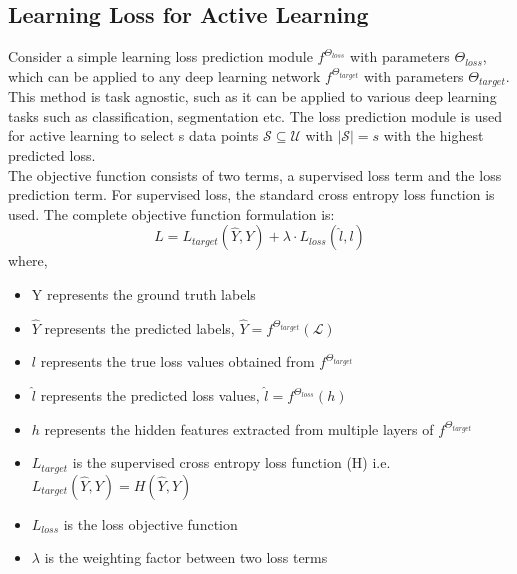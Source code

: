 \subsection{Learning Loss for Active Learning}
Consider a simple learning loss prediction module\cite{yoo2019} $f^{\Theta_{loss}}$ with parameters $\Theta_{loss}$, which can be applied to any deep learning network $f^{\Theta_{target}}$ with parameters $\Theta_{target}$. This method is task agnostic, such as it can be applied to various deep learning tasks such as classification, segmentation etc. The loss prediction module is used for active learning to select s data points $\mathcal{S} \subseteq \mathcal{U}$ with $|\mathcal{S}| = s$ with the highest predicted loss. \\
The objective function consists of two terms, a supervised loss term and the loss prediction term. For supervised loss, the standard cross entropy loss function\cite{cox1958} is used. The complete objective function formulation is:
\begin{equation}
    \label{equation:learning_loss_full_loss}
    L = L_{target}(\hat{Y}, Y) + \lambda \cdot L_{loss}(\hat{l}, l)
\end{equation}
where,
\begin{itemize}[label={}]
  \setlength\itemsep{0em}
  \item Y represents the ground truth labels
  \item $\hat{Y}$ represents the predicted labels, $\hat{Y} = f^{\Theta_{target}}(\mathcal{L})$
  \item $l$ represents the true loss values obtained from $f^{\Theta_{target}}$
  \item $\hat{l}$ represents the predicted loss values, $\hat{l} = f^{\Theta_{loss}}(h)$
  \item $h$ represents the hidden features extracted from multiple layers of $f^{\Theta_{target}}$
  \item $L_{target}$ is the supervised cross entropy loss function (H) i.e. $L_{target}(\hat{Y}, Y) = H(\hat{Y}, Y)$
  \item $L_{loss}$ is the loss objective function
  \item $\lambda$ is the weighting factor between two loss terms
\end{itemize}

